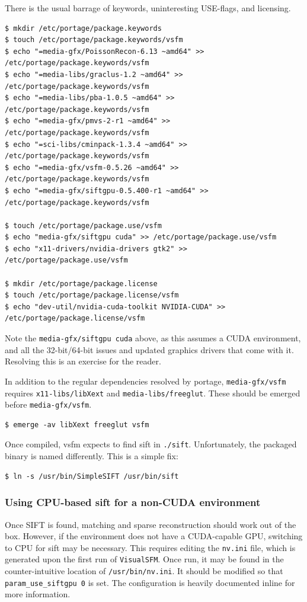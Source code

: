 \documentclass{article}
\begin{document}
There is the usual barrage of keywords, uninteresting USE-flags, and licensing.

\begin{lstlisting}
$ mkdir /etc/portage/package.keywords
$ touch /etc/portage/package.keywords/vsfm
$ echo "=media-gfx/PoissonRecon-6.13 ~amd64" >> /etc/portage/package.keywords/vsfm
$ echo "=media-libs/graclus-1.2 ~amd64" >> /etc/portage/package.keywords/vsfm
$ echo "=media-libs/pba-1.0.5 ~amd64" >> /etc/portage/package.keywords/vsfm
$ echo "=media-gfx/pmvs-2-r1 ~amd64" >> /etc/portage/package.keywords/vsfm
$ echo "=sci-libs/cminpack-1.3.4 ~amd64" >> /etc/portage/package.keywords/vsfm
$ echo "=media-gfx/vsfm-0.5.26 ~amd64" >> /etc/portage/package.keywords/vsfm
$ echo "=media-gfx/siftgpu-0.5.400-r1 ~amd64" >> /etc/portage/package.keywords/vsfm

$ touch /etc/portage/package.use/vsfm
$ echo "media-gfx/siftgpu cuda" >> /etc/portage/package.use/vsfm
$ echo "x11-drivers/nvidia-drivers gtk2" >> /etc/portage/package.use/vsfm

$ mkdir /etc/portage/package.license
$ touch /etc/portage/package.license/vsfm
$ echo "dev-util/nvidia-cuda-toolkit NVIDIA-CUDA" >> /etc/portage/package.license/vsfm
\end{lstlisting}

Note the {\tt media-gfx/siftgpu cuda} above, as this assumes a CUDA environment, and all the 32-bit/64-bit issues and updated graphics drivers that come with it. Resolving this is an exercise for the reader.

In addition to the regular dependencies resolved by portage, {\tt media-gfx/vsfm} requires {\tt x11-libs/libXext} and {\tt media-libs/freeglut}. These should be emerged before {\tt media-gfx/vsfm}.

\begin{lstlisting}
$ emerge -av libXext freeglut vsfm
\end{lstlisting}

Once compiled, vsfm expects to find sift in {\tt ./sift}. Unfortunately, the packaged binary is named differently. This is a simple fix:
\begin{lstlisting}
$ ln -s /usr/bin/SimpleSIFT /usr/bin/sift
\end{lstlisting}

\subsubsection{Using CPU-based sift for a non-CUDA environment}
Once SIFT is found, matching and sparse reconstruction should work out of the box. However, if the environment does not have a CUDA-capable GPU, switching to CPU for sift may be necessary. This requires editing the {\tt nv.ini} file, which is generated upon the first run of {\tt VisualSFM}. Once run, it may be found in the counter-intuitive location of {\tt /usr/bin/nv.ini}. It should be modified so that {\tt param\_use\_siftgpu 0} is set. The configuration is heavily documented inline for more information.
\end{document}
